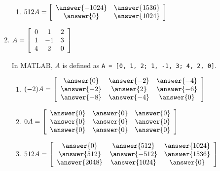 \documentclass{ximera}
\begin{document}
\begin{problem}
\begin{enumerate}
\begin{enumerate}
      \item $512A =
      \startmat{cc}
      \answer{-1024} & \answer{1536} \\
      \answer{0} & \answer{1024}
      \stopmat$
    \end{enumerate}

  \item
    $A = \startmat{ccc}
      0 & 1 & 2 \\
      1 & -1 & 3 \\
      4 & 2 & 0
    \stopmat$

    \begin{hint}
        
          In MATLAB, $A$ is defined as \texttt{A = [0, 1, 2; 1, -1, 3; 4, 2, 0]}.
    \end{hint}

    \begin{enumerate}
      \item $(-2)A = 
      \startmat{ccc}
      \answer{0} & \answer{-2} & \answer{-4} \\
      \answer{-2} & \answer{2} & \answer{-6} \\
      \answer{-8} & \answer{-4} & \answer{0}
      \stopmat$

      \item $0A =
      \startmat{ccc}
      \answer{0} & \answer{0} & \answer{0} \\
      \answer{0} & \answer{0} & \answer{0} \\
      \answer{0} & \answer{0} & \answer{0}
      \stopmat$

      \item $512A =
      \startmat{ccc}
      \answer{0} & \answer{512} & \answer{1024} \\
      \answer{512} & \answer{-512} & \answer{1536} \\
      \answer{2048} & \answer{1024} & \answer{0}
      \stopmat$
    \end{enumerate}


  
  \end{enumerate}

\end{problem}
\end{document}
